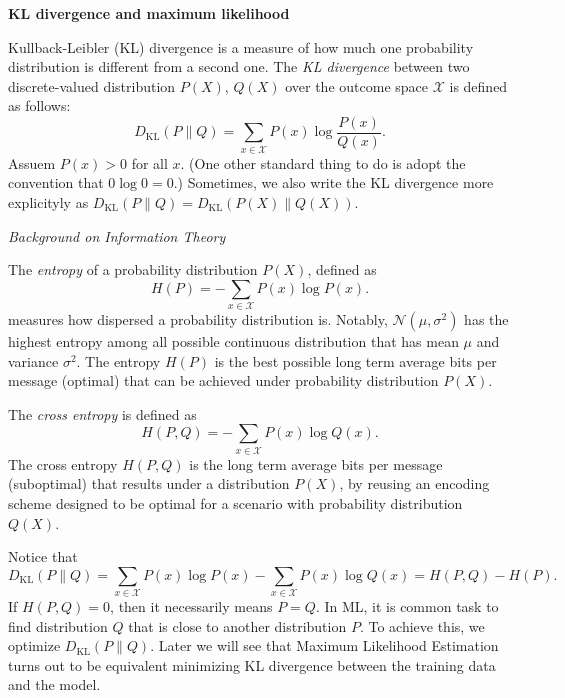 \documentclass[12pt,letterpaper,boxed]{hmcpset}
\newcommand{\DKL}[2]{D_{\mathrm{KL}}(#1 \parallel #2)}
\begin{document}
\begin{problem}[Problem 2]
  \textbf{KL divergence and maximum likelihood}

  Kullback-Leibler (KL) divergence is a measure of how much one probability distribution is different from a second one. The \emph{KL divergence} between two discrete-valued distribution $P(X)$, $Q(X)$ over the outcome space $\mathcal{X}$ is defined as follows:
  \[
    \DKL{P}{Q} = \sum_{x \in \mathcal{X}} P(x) \log \frac{P(x)}{Q(x)}.
  \]
  Assuem $P(x) > 0$ for all $x$. (One other standard thing to do is adopt the convention that $0 \log 0 = 0$.) Sometimes, we also write the KL divergence more explicityly as $\DKL{P}{Q} = \DKL{P(X)}{Q(X)}$.

  \emph{Background on Information Theory}

  The \emph{entropy} of a probability distribution $P(X)$, defined as 
  \[
  H(P) = - \sum_{x \in \mathcal{X}} P(x) \log P(x).
  \]
  measures how dispersed a probability distribution is. Notably, $\mathcal{N}(\mu, \sigma^2)$ has the highest entropy among all possible continuous distribution that has mean $\mu$ and variance $\sigma^2$. The entropy $H(P)$ is the best possible long term average bits per message (optimal) that can be achieved under probability distribution $P(X)$.

  The \emph{cross entropy} is defined as
  \[
  H(P, Q) = - \sum_{x \in \mathcal{X}} P(x) \log Q(x).
  \]
  The cross entropy $H(P, Q)$ is the long term average bits per message (suboptimal) that results under a distribution $P(X)$, by reusing an encoding scheme designed to be optimal for a scenario with probability distribution $Q(X)$.

  Notice that 
  \[
  \DKL{P}{Q} = \sum_{x \in \mathcal{X}} P(x) \log P(x) - \sum_{x \in \mathcal{X}} P(x) \log Q(x) = H(P, Q) - H(P).
  \]
  If $H(P,Q) = 0$, then it necessarily means $P=Q$. In ML, it is common task to find distribution $Q$ that is close to another distribution $P$. To achieve this, we optimize $\DKL{P}{Q}$. Later we will see that Maximum Likelihood Estimation turns out to be equivalent minimizing KL divergence between the training data and the model.
\end{problem}
\end{document}
